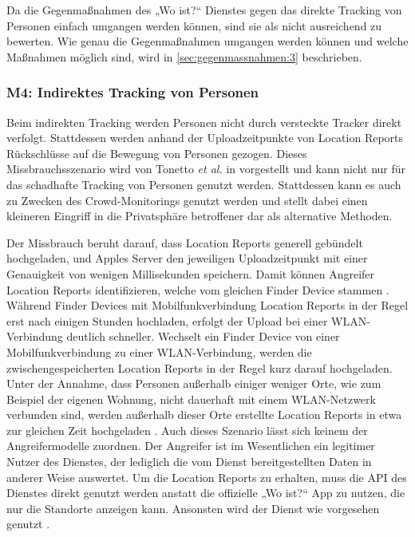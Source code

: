 Da die Gegenmaßnahmen des „Wo ist?“ Dienstes gegen das direkte Tracking von Personen einfach umgangen werden können, sind sie als nicht ausreichend zu bewerten.
Wie genau die Gegenmaßnahmen umgangen werden können und welche Maßnahmen möglich sind, wird in \autoref{sec:gegenmassnahmen:3} beschrieben.


\subsubsection[M4]{M4: Indirektes Tracking von Personen}
\label{missbrauch:4}
Beim indirekten Tracking werden Personen nicht durch versteckte Tracker direkt verfolgt.
Stattdessen werden anhand der Uploadzeitpunkte von Location Reports Rückschlüsse auf die Bewegung von Personen gezogen.
Dieses Missbrauchsszenario wird von Tonetto \textit{et al.} in \cite{Tonetto_FindMy} vorgestellt und kann nicht nur für das schadhafte Tracking von Personen genutzt werden.
Stattdessen kann es auch zu Zwecken des Crowd-Monitorings genutzt werden und stellt dabei einen kleineren Eingriff in die Privatsphäre betroffener dar als alternative Methoden. 

Der Missbrauch beruht darauf, dass Location Reports generell gebündelt hochgeladen, und Apples Server den jeweiligen Uploadzeitpunkt mit einer Genauigkeit von wenigen Millisekunden speichern.
Damit können Angreifer Location Reports identifizieren, welche vom gleichen Finder Device stammen \cite{Tonetto_FindMy}.
Während Finder Devices mit Mobilfunkverbindung Location Reports in der Regel erst nach einigen Stunden hochladen, erfolgt der Upload bei einer WLAN-Verbindung deutlich schneller.
Wechselt ein Finder Device von einer Mobilfunkverbindung zu einer WLAN-Verbindung, werden die zwischengespeicherten Location Reports in der Regel kurz darauf hochgeladen.
Unter der Annahme, dass Personen außerhalb einiger weniger Orte, wie zum Beispiel der eigenen Wohnung, nicht dauerhaft mit einem WLAN-Netzwerk verbunden sind, werden außerhalb dieser Orte erstellte Location Reports in etwa zur gleichen Zeit hochgeladen \cite{Tonetto_FindMy}.
Auch dieses Szenario lässt sich keinem der Angreifermodelle zuordnen. 
Der Angreifer ist im Wesentlichen ein legitimer Nutzer des Dienstes, der lediglich die vom Dienst bereitgestellten Daten in anderer Weise auswertet.
Um die Location Reports zu erhalten, muss die \ac{API} des Dienstes direkt genutzt werden anstatt die offizielle „Wo ist?“ App zu nutzen, die nur die Standorte anzeigen kann.
Ansonsten wird der Dienst wie vorgesehen genutzt \cite{Tonetto_FindMy}.

